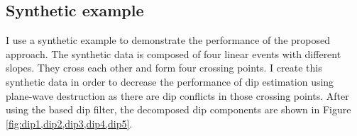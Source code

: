 \subsection{Synthetic example}
I  use a  synthetic example  to demonstrate the performance of the proposed approach. The synthetic data is composed of four linear events with different slopes. They cross each other and form four crossing points. I create this synthetic data in order to decrease the performance of dip estimation using plane-wave destruction as there are dip conflicts in those crossing points. After using the  based dip filter, the decomposed dip components are shown in Figure \ref{fig:dip1,dip2,dip3,dip4,dip5}. %


